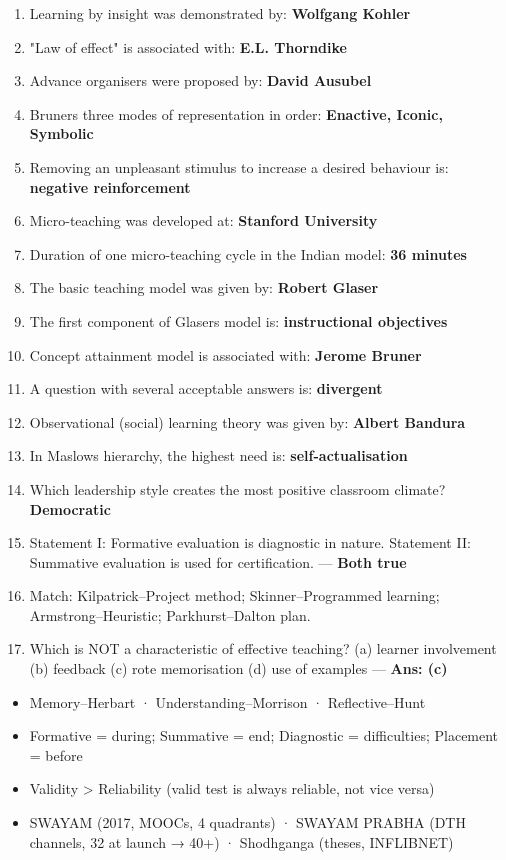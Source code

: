 \begin{enumerate}
\def\labelenumi{\arabic{enumi}.}
\setcounter{enumi}{26}
\tightlist
\item
  Learning by insight was demonstrated by: \textbf{Wolfgang Kohler}
\item
  "Law of effect" is associated with: \textbf{E.L. Thorndike}
\item
  Advance organisers were proposed by: \textbf{David Ausubel}
\item
  Bruner\textquotesingle s three modes of representation in order: \textbf{Enactive, Iconic, Symbolic}
\item
  Removing an unpleasant stimulus to increase a desired behaviour is: \textbf{negative reinforcement}
\item
  Micro-teaching was developed at: \textbf{Stanford University}
\item
  Duration of one micro-teaching cycle in the Indian model: \textbf{36 minutes}
\item
  The basic teaching model was given by: \textbf{Robert Glaser}
\item
  The first component of Glaser\textquotesingle s model is: \textbf{instructional objectives}
\item
  Concept attainment model is associated with: \textbf{Jerome Bruner}
\item
  A question with several acceptable answers is: \textbf{divergent}
\item
  Observational (social) learning theory was given by: \textbf{Albert Bandura}
\item
  In Maslow\textquotesingle s hierarchy, the highest need is: \textbf{self-actualisation}
\item
  Which leadership style creates the most positive classroom climate? \textbf{Democratic}
\item
  Statement I: Formative evaluation is diagnostic in nature. Statement II: Summative evaluation is used for certification. --- \textbf{Both true}
\item
  Match: Kilpatrick--Project method; Skinner--Programmed learning; Armstrong--Heuristic; Parkhurst--Dalton plan.
\item
  Which is NOT a characteristic of effective teaching? (a) learner involvement (b) feedback (c) rote memorisation (d) use of examples --- \textbf{Ans: (c)}
\end{enumerate}

\begin{revbox}

\begin{itemize}
\tightlist
\item
  Memory--Herbart · Understanding--Morrison · Reflective--Hunt
\item
  Formative = during; Summative = end; Diagnostic = difficulties; Placement = before
\item
  Validity \textgreater{} Reliability (valid test is always reliable, not vice versa)
\item
  SWAYAM (2017, MOOCs, 4 quadrants) · SWAYAM PRABHA (DTH channels, 32 at launch → 40+) · Shodhganga (theses, INFLIBNET)
\end{itemize}

\end{revbox}
